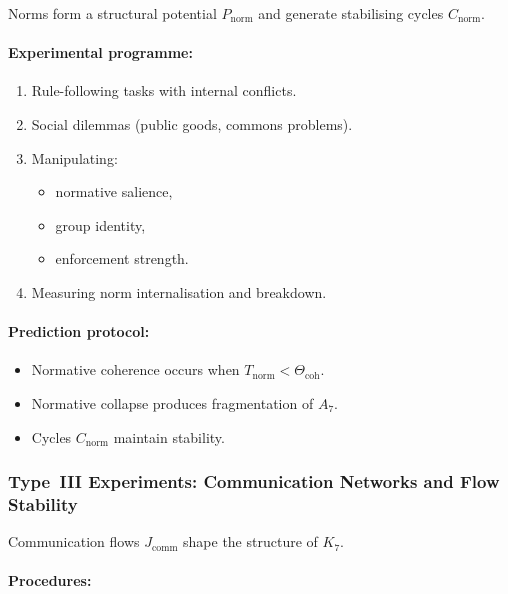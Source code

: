 Norms form a structural potential $P_{\mathrm{norm}}$ and
generate stabilising cycles $C_{\mathrm{norm}}$.

\paragraph{Experimental programme:}

\begin{enumerate}
    \item Rule-following tasks with internal conflicts.
    \item Social dilemmas (public goods, commons problems).
    \item Manipulating:
          \begin{itemize}
              \item normative salience,
              \item group identity,
              \item enforcement strength.
          \end{itemize}
    \item Measuring norm internalisation and breakdown.
\end{enumerate}

\paragraph{Prediction protocol:}

\begin{itemize}
    \item Normative coherence occurs when
          $T_{\mathrm{norm}} < \Theta_{\mathrm{coh}}$.
    \item Normative collapse produces fragmentation of $A_7$.
    \item Cycles $C_{\mathrm{norm}}$ maintain stability.
\end{itemize}



\subsubsection{Type~III Experiments: Communication Networks and Flow Stability}

Communication flows $J_{\mathrm{comm}}$ shape the structure of $K_7$.

\paragraph{Procedures:}

